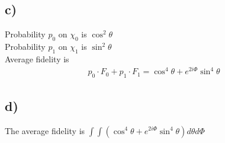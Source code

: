 \subsection*{c)}
Probability $p_0$ on $\chi_0$ is $\cos^2\theta$\\
Probability $p_1$ on $\chi_1$ is $\sin^2\theta$\\
Average fidelity is
\begin{align*}
    p_0\cdot F_0 + p_1\cdot F_1 = \cos^4\theta + e^{2i\Phi}\sin^4\theta
\end{align*}

\subsection*{d)}
The average fidelity is $\int\int(\cos^4\theta + e^{2i\Phi}\sin^4\theta) d\theta d\Phi$
